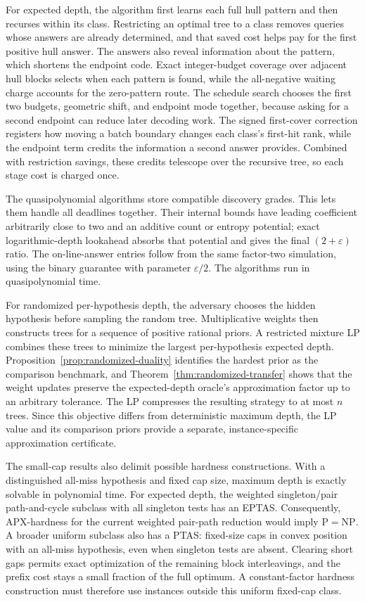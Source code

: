 For expected depth, the algorithm first learns each full hull pattern
and then recurses within its class. Restricting an optimal tree to a
class removes queries whose answers are already determined, and that
saved cost helps pay for the first positive hull answer. The answers
also reveal information about the pattern, which shortens the endpoint
code. Exact integer-budget coverage over adjacent hull blocks selects
when each pattern is found, while the all-negative waiting charge
accounts for the zero-pattern route. The schedule search chooses the
first two budgets, geometric shift, and endpoint mode together, because
asking for a second endpoint can reduce later decoding work. The signed
first-cover correction registers how moving a batch boundary changes
each class's first-hit rank, while the endpoint term credits the
information a second answer provides. Combined with restriction
savings, these credits telescope over the recursive tree, so each stage
cost is charged once.

The quasipolynomial algorithms store compatible discovery grades.
This lets them handle all deadlines together. Their internal bounds
have leading coefficient arbitrarily close to two and an additive
count or entropy potential; exact logarithmic-depth lookahead absorbs
that potential and gives the final $(2+\varepsilon)$ ratio.
The on-line-answer entries follow from the same factor-two simulation,
using the binary guarantee with parameter $\varepsilon/2$.
The algorithms run in quasipolynomial time.

For randomized per-hypothesis depth, the adversary chooses the hidden
hypothesis before sampling the random tree. Multiplicative weights
then constructs trees for a sequence of positive rational priors.
A restricted mixture LP combines these trees to minimize the largest
per-hypothesis expected depth. Proposition~\ref{prop:randomized-duality}
identifies the hardest prior as the comparison benchmark, and
Theorem~\ref{thm:randomized-transfer} shows that the weight updates
preserve the expected-depth oracle's approximation factor up to an
arbitrary tolerance. The LP compresses the resulting strategy to at
most $n$ trees. Since this objective differs from deterministic
maximum depth, the LP value and its comparison priors provide a
separate, instance-specific approximation certificate.

The small-cap results also delimit possible hardness constructions.
With a distinguished all-miss hypothesis and fixed cap size, maximum
depth is exactly solvable in polynomial time. For expected depth, the
weighted singleton/pair path-and-cycle subclass with all singleton
tests has an EPTAS. Consequently, APX-hardness for the current weighted
pair-path reduction would imply $\mathrm P=\mathrm{NP}$. A broader
uniform subclass also has a PTAS: fixed-size caps in convex position
with an all-miss hypothesis, even when singleton tests are absent.
Clearing short gaps permits exact optimization of the remaining block
interleavings, and the prefix cost stays a small fraction of the full
optimum. A constant-factor hardness construction must therefore use
instances outside this uniform fixed-cap class.

